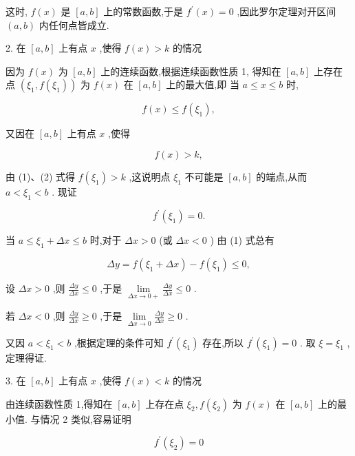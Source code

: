 \documentclass[lang=cn,newtx,10pt,scheme=chinese]{elegantbook}
\begin{document}
这时, \(f\left( x\right)\) 是 \(\left\lbrack {a,b}\right\rbrack\) 上的常数函数,于是 \({f}^{\prime }\left( x\right) = 0\) ,因此罗尔定理对开区间 \(\left( {a,b}\right)\) 内任何点皆成立.

2. 在 \(\left\lbrack {a,b}\right\rbrack\) 上有点 \(x\) ,使得 \(f\left( x\right) > k\) 的情况

因为 \(f\left( x\right)\) 为 \(\left\lbrack {a,b}\right\rbrack\) 上的连续函数,根据连续函数性质 1, 得知在 \(\left\lbrack {a,b}\right\rbrack\) 上存在点 \(\left( {{\xi }_{1},f\left( {\xi }_{1}\right) }\right)\) 为 \(f\left( x\right)\) 在 \(\left\lbrack {a,b}\right\rbrack\) 上的最大值,即 当 \(a \leq x \leq b\) 时,

\[
f\left( x\right) \leq f\left( {\xi }_{1}\right) , \tag{1}
\]

又因在 \(\left\lbrack {a,b}\right\rbrack\) 上有点 \(x\) ,使得

\[
f\left( x\right) > k, \tag{2}
\]

由 (1)、(2) 式得 \(f\left( {\xi }_{1}\right) > k\) ,这说明点 \({\xi }_{1}\) 不可能是 \(\left\lbrack {a,b}\right\rbrack\) 的端点,从而 \(a < {\xi }_{1} < b\) . 现证

\[
{f}^{\prime }\left( {\xi }_{1}\right) = 0\text{.}
\]

当 \(a \leq {\xi }_{1} + {\Delta x} \leq b\) 时,对于 \({\Delta x} > 0\) (或 \({\Delta x} < 0\) ) 由 (1) 式总有

\[
{\Delta y} = f\left( {{\xi }_{1} + {\Delta x}}\right) - f\left( {\xi }_{1}\right) \leq 0,
\]

设 \({\Delta x} > 0\) ,则 \(\frac{\Delta y}{\Delta x} \leq 0\) ,于是 \(\mathop{\lim }\limits_{{{\Delta x} \rightarrow 0 + }}\frac{\Delta y}{\Delta x} \leq 0\) .

若 \({\Delta x} < 0\) ,则 \(\frac{\Delta y}{\Delta x} \geq 0\) ,于是 \(\mathop{\lim }\limits_{{{\Delta x} \rightarrow 0}}\frac{\Delta y}{\Delta x} \geq 0\) .

又因 \(a < {\xi }_{1} < b\) ,根据定理的条件可知 \({f}^{\prime }\left( {\xi }_{1}\right)\) 存在,所以 \({f}^{\prime }\left( {\xi }_{1}\right) = 0\) . 取 \(\xi = {\xi }_{1}\) ,定理得证.

3. 在 \(\left\lbrack {a,b}\right\rbrack\) 上有点 \(x\) ,使得 \(f\left( x\right) < k\) 的情况

由连续函数性质 1,得知在 \(\left\lbrack {a,b}\right\rbrack\) 上存在点 \({\xi }_{2},f\left( {\xi }_{2}\right)\) 为 \(f\left( x\right)\) 在 \(\left\lbrack {a,b}\right\rbrack\) 上的最小值. 与情况 2 类似,容易证明

\[
{f}^{\prime }\left( {\xi }_{2}\right) = 0
\]
\end{document}
